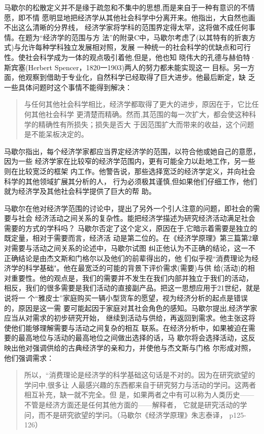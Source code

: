 马歇尔的松散定义并不是缘于疏忽和不集中的思想,而是来自于一种有意识的不情愿，即不情
愿明显地把经济学从其他社会科学中分离开来。他指出，大自然也画不出这么清晰的分界线，
经济学家将学科的范围界定得太罕，这将做不成任何事情。在题为“经济学的范围与方
法”的附录C中，马歇尔考虑了(以其特有的折衷方式)与允许每种学科独立发展相对照，发展
一种统一的社会科学的优缺点和可行性。使社会科学成为一体的观点吸引着他,但是，他也知
晓伟大的孔德与赫伯特·斯宾塞(Herbert Spencer，1820一1903)两人的努力都未能实现这一
目标。另一方面，他观察到借助于专业化，自然科学已经取得了巨大进步。他最后断定，缺
乏一些具体问题时这个事情不能得到解决：
\begin{quotation}
与任何其他社会科学相比，经济学都取得了更大的进步，原因在于，它比任何其他社会科学
更清楚而精确。然而,其范围的每一次扩大，都会使这种科学的精确性有所损失；损失是否大
于因范围扩大而带来的收益，这个问题是不能呆板决定的。
\end{quotation}

马歇尔指出，每个经济学家都应当界定经济学的范围，以符合他或她自己的意愿，因为一些
经济学家在比较窄的经济学范围内，更有可能全力以赴地工作，另一些则在比较宽泛的框架
内工作。他警告说，那些选择宽泛的经济学定义，并向社会科学的其他领域扩展其分析的人，
行为必须极其谨慎,但如果他们仔细工作，他们就为经济学及其他社会科学提供了巨大的帮
助。

马歇尔在他对经济学范围的讨论中，提出了另外一个引人注意的问题，即社会的需要与社会
经济活动之间关系的复杂性。能把经济学描述为研究经济活动满足社会需要的方式的学科吗？
马歇尔否定了这个定义，原因在于,它暗示着需要是独立的既定量，相对于需要而言，经济活
动是第二位的。在《经济学原理》第三篇第2章对需要与活动之间关系的论述中，马歇尔试图
纠正他认为不正确的结论，这一不正确结论是由杰文斯和门格尔以及他们的前辈得出的，他
们似乎视“消费理论为经济学的科学基础"。他在最宽泛的可能的背景下评价需求(需要)与供
给(活动)的相对重要性。他的观点是，我们的需要并不发生在我们内部并独立于我们的活动，
相反，我们的很多需要是我们活动的直接副产品。把这一思想应用于21世纪，就是说将一
个“雅皮士”家庭购买一辆小型货车的愿望，视为经济分析的起点是错误的，原因是这一需
要可能起因于家庭对其社会角色的感知。马歇尔提出,经济学家应当从对需求的初步研究开始，
继续到活动与供给，再返回到需求。他主张这将使他们能够理解需要与活动之间复杂的相互
联系。在经济分析中，如果被迫在需要的最高地位与活动的最高地位之间做出选择的话，马
歇尔将会选择活动，这反映出他对强调供给的古典经济学的亲和力，并使他与杰文斯与门格
尔形成对照，他们强调需求：
\begin{quotation}
  所以，“消费理论是经济学的科学基础这句话是不对的。因为在研究欲望的学问中,很多让
  人最感兴趣的东西都来自于研究努力与活动的学问。这两者相互补充，缺一就不完全。但
  是，如果两者之中有可以称为人类历史——不管是经济方面还是任何其他方面的——解释者，
  它就是研究活动的学问，而不是研究欲望的学问。（马歇尔《经济学原理》朱志泰译，
  p125-126）
\end{quotation}

